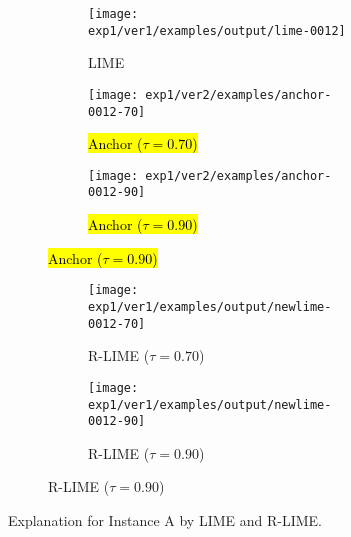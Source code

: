 \begin{figure}[t]
	\begin{subfigure}[t]{0.45\textwidth}
		\centering
		\begin{subfigure}[t]{\textwidth}
			\hspace{-10pt}
			\texttt{[image: exp1/ver1/examples/output/lime-0012]}
			\caption{LIME}\label{fig:lime-0}
			\vspace{1.0em}
		\end{subfigure}

		\vspace{10pt}
		\begin{subfigure}[t]{\textwidth}
			\centering
			\texttt{[image: exp1/ver2/examples/anchor-0012-70]}  %
			\caption{\hl{Anchor ($\tau=0.70$)}}\label{fig:anchor-0-70}
			\vspace{1.0em}
		\end{subfigure}

		\vspace{10pt}
		\begin{subfigure}[t]{\textwidth}
			\centering
			\texttt{[image: exp1/ver2/examples/anchor-0012-90]}  %
			\caption{\hl{Anchor ($\tau=0.90$)}}\label{fig:anchor-0-90}
			\vspace{1.0em}
		\end{subfigure}
	\end{subfigure}
	\hfill
	\begin{subfigure}[t]{0.45\textwidth}
		\begin{subfigure}[t]{\textwidth}
			\hspace{-5pt}
			\texttt{[image: exp1/ver1/examples/output/newlime-0012-70]}  %
			\caption{R-LIME ($\tau=0.70$)}\label{fig:rlime-0-70}
		\end{subfigure}
		\begin{subfigure}[t]{\textwidth}
			\hspace{-17pt}
			\texttt{[image: exp1/ver1/examples/output/newlime-0012-90]}  %
			\caption{R-LIME ($\tau=0.90$)}
		\end{subfigure}
	\end{subfigure}
	\caption[Explanation for Instance A by LIME and R-LIME]{%
		Explanation for Instance A by LIME and R-LIME\@.
	}\label{fig:A}
\end{figure}
